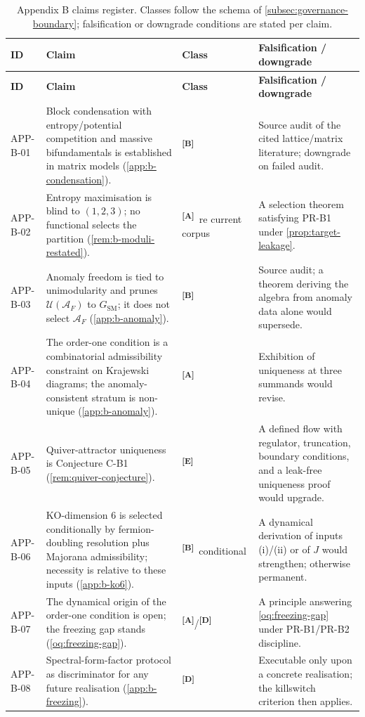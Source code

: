 \documentclass[12pt,a4paper,twoside]{article}
\theoremstyle{plain}
\theoremstyle{definition}
\theoremstyle{remark}
\newcommand{\catmark}[1]{\textsuperscript{\textsf{\textbf{[#1]}}}}
\begin{document}
\begin{longtable}{p{} p{} p{} p{}}
\caption{Appendix B claims register. Classes follow the schema of \cref{subsec:governance-boundary}; falsification or downgrade conditions are stated per claim.}\\
\toprule
\textbf{ID} & \textbf{Claim} & \textbf{Class} & \textbf{Falsification / downgrade} \\
\midrule
\endfirsthead
\toprule
\textbf{ID} & \textbf{Claim} & \textbf{Class} & \textbf{Falsification / downgrade} \\
\midrule
\endhead
APP-B-01 & Block condensation with entropy/potential competition and massive bifundamentals is established in matrix models (\cref{app:b-condensation}). & \catmark{B} & Source audit of the cited lattice/matrix literature; downgrade on failed audit. \\
APP-B-02 & Entropy maximisation is blind to $(1,2,3)$; no functional selects the partition (\cref{rem:b-moduli-restated}). & \catmark{A}\ re current corpus & A selection theorem satisfying PR-B1 under \cref{prop:target-leakage}. \\
APP-B-03 & Anomaly freedom is tied to unimodularity and prunes $\mathcal{U}(\mathcal{A}_F)$ to $G_{\mathrm{SM}}$; it does not select $\mathcal{A}_F$ (\cref{app:b-anomaly}). & \catmark{B} & Source audit; a theorem deriving the algebra from anomaly data alone would supersede. \\
APP-B-04 & The order-one condition is a combinatorial admissibility constraint on Krajewski diagrams; the anomaly-consistent stratum is non-unique (\cref{app:b-anomaly}). & \catmark{A} & Exhibition of uniqueness at three summands would revise. \\
APP-B-05 & Quiver-attractor uniqueness is Conjecture C-B1 (\cref{rem:quiver-conjecture}). & \catmark{E} & A defined flow with regulator, truncation, boundary conditions, and a leak-free uniqueness proof would upgrade. \\
APP-B-06 & KO-dimension 6 is selected conditionally by fermion-doubling resolution plus Majorana admissibility; necessity is relative to these inputs (\cref{app:b-ko6}). & \catmark{B}\ conditional & A dynamical derivation of inputs (i)/(ii) or of $J$ would strengthen; otherwise permanent. \\
APP-B-07 & The dynamical origin of the order-one condition is open; the freezing gap stands (\cref{oq:freezing-gap}). & \catmark{A}/\catmark{D} & A principle answering \cref{oq:freezing-gap} under PR-B1/PR-B2 discipline. \\
APP-B-08 & Spectral-form-factor protocol as discriminator for any future realisation (\cref{app:b-freezing}). & \catmark{D} & Executable only upon a concrete realisation; the killswitch criterion then applies. \\
\bottomrule
\end{longtable}
\end{document}
